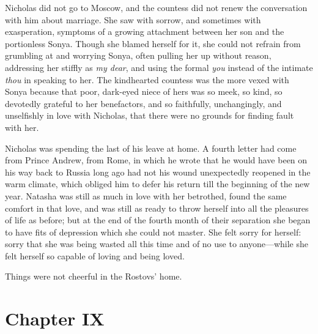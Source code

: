Nicholas did not go to Moscow, and the countess did not renew the
conversation with him about marriage. She saw with sorrow, and
sometimes with exasperation, symptoms of a growing attachment
between her son and the portionless Sonya. Though she blamed
herself for it, she could not refrain from grumbling at and
worrying Sonya, often pulling her up without reason, addressing
her stiffly as \emph{my dear}, and using the formal \emph{you}
instead of the intimate \emph{thou} in speaking to her. The
kindhearted countess was the more vexed with Sonya because that
poor, dark-eyed niece of hers was so meek, so kind, so devotedly
grateful to her benefactors, and so faithfully, unchangingly, and
unselfishly in love with Nicholas, that there were no grounds for
finding fault with her.

Nicholas was spending the last of his leave at home. A fourth
letter had come from Prince Andrew, from Rome, in which he wrote
that he would have been on his way back to Russia long ago had
not his wound unexpectedly reopened in the warm climate, which
obliged him to defer his return till the beginning of the new
year. Natasha was still as much in love with her betrothed, found
the same comfort in that love, and was still as ready to throw
herself into all the pleasures of life as before; but at the end
of the fourth month of their separation she began to have fits of
depression which she could not master. She felt sorry for
herself: sorry that she was being wasted all this time and of no
use to anyone---while she felt herself so capable of loving and
being loved.

Things were not cheerful in the Rostovs' home.


\chapter*{Chapter IX}
\ifaudio     
{} 
\fi

